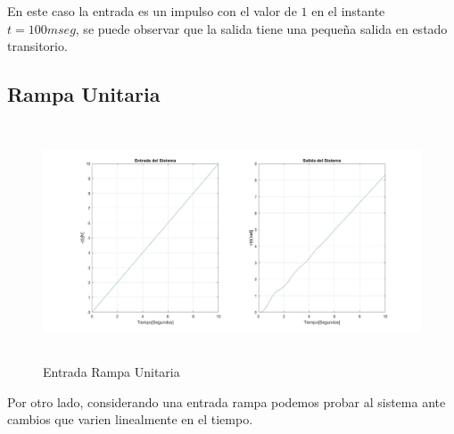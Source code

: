 \documentclass[12pt]{article}
\begin{document}
En este caso la entrada es un impulso con el valor de $1$ en el instante $t=100mseg$, se puede observar que la salida tiene una pequeña salida en estado transitorio.

\subsection{Rampa Unitaria}

\begin{figure}[h]
    \centering
    \includegraphics[width=17cm, height=7cm]{rampa.jpg}
    \caption{Entrada Rampa Unitaria}
    \label{fig:ramp}
\end{figure}

Por otro lado, considerando una entrada rampa podemos probar al sistema ante cambios que varien linealmente en el tiempo.
\newpage
\end{document}
